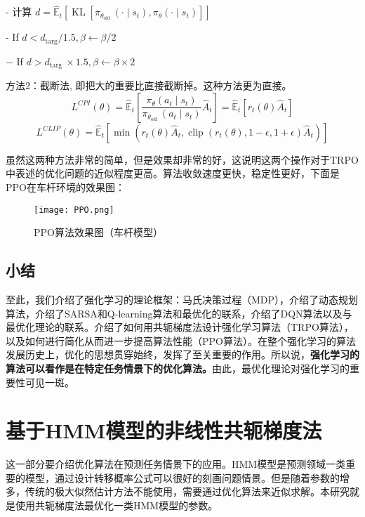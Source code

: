 - 计算 $d=\hat{\mathbb{E}}_{t}\left[\operatorname{KL}\left[\pi_{\theta_{\text {old }}}\left(\cdot \mid s_{t}\right), \pi_{\theta}\left(\cdot \mid s_{t}\right)\right]\right]$

- If $d<d_{\operatorname{targ}} / 1.5, \beta \leftarrow \beta / 2$

$-$ If $d>d_{\text {targ }} \times 1.5, \beta \leftarrow \beta \times 2$

方法2：截断法, 即把大的重要比直接截断掉。这种方法更为直接。
$$
L^{C P I}(\theta)=\hat{\mathbb{E}}_{t}\left[\frac{\pi_{\theta}\left(a_{t} \mid s_{t}\right)}{\pi_{\theta_{\text {old }}}\left(a_{t} \mid s_{t}\right)} \hat{A}_{t}\right]=\hat{\mathbb{E}}_{t}\left[r_{t}(\theta) \hat{A}_{t}\right]
$$
$$
L^{C L I P}(\theta)=\hat{\mathbb{E}}_{t}\left[\min \left(r_{t}(\theta) \hat{A}_{t}, \operatorname{clip}\left(r_{t}(\theta), 1-\epsilon, 1+\epsilon\right) \hat{A}_{t}\right)\right]
$$

虽然这两种方法非常的简单，但是效果却非常的好，这说明这两个操作对于TRPO中表述的优化问题的近似程度更高。算法收敛速度更快，稳定性更好，下面是PPO在车杆环境的效果图：
\begin{figure}[hbt]
    \centering
    \texttt{[image: PPO.png]}
	\vspace{-0.5cm}
    \caption{PPO算法效果图（车杆模型）}
    \label{PPO}
\end{figure}

\section{小结}
至此，我们介绍了强化学习的理论框架：马氏决策过程（MDP\cite{sutton2018reinforcement}），介绍了动态规划\cite{geramifard2013tutorial}\cite{szepesvari1996generalized}算法，介绍了SARSA\cite{jaakkola1993convergence}和Q-learning\cite{rummery1994line}\cite{melo2001convergence}算法和最优化的联系，介绍了DQN\cite{mnih2013playing}\cite{mnih2015human}算法以及与最优化理论的联系。介绍了如何用共轭梯度法设计强化学习算法（TRPO算法\cite{schulman2015trust}），以及如何进行简化从而进一步提高算法性能（PPO算法\cite{schulman2017proximal}）。在整个强化学习的算法发展历史上，优化的思想贯穿始终，发挥了至关重要的作用。所以说，\textbf{强化学习的算法可以看作是在特定任务情景下的优化算法。}由此，最优化理论对强化学习的重要性可见一斑。
\chapter{基于HMM模型的非线性共轭梯度法}
这一部分要介绍优化算法在预测任务情景下的应用。HMM模型是预测领域一类重要的模型\cite{马少辉2014客户关系动态优化模型与实证研究}，通过设计转移概率公式可以很好的刻画问题情景。但是随着参数的增多，传统的极大似然估计方法不能使用，需要通过优化算法来近似求解。本研究就是使用共轭梯度法最优化一类HMM模型的参数。
